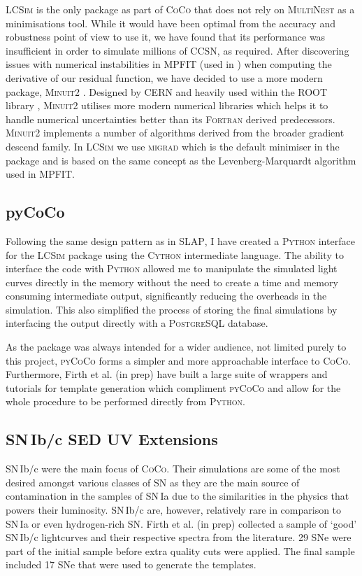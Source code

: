 \textsc{LCSim} is the only package as part of \textsc{CoCo} that does not rely on \textsc{MultiNest} as a minimisations tool. While it would have been optimal from the accuracy and robustness point of view to use it, we have found that its performance was insufficient in order to simulate millions of CCSN, as required. After discovering issues with numerical instabilities in \textsc{MPFIT} (used in ) when computing the derivative of our residual function, we have decided to use a more modern package, \textsc{Minuit2} \citep{James1975}. Designed by CERN and heavily used within the ROOT library \citep{Brun1997}, \textsc{Minuit2} utilises more modern numerical libraries which helps it to handle numerical uncertainties better than its \textsc{Fortran} derived predecessors. \textsc{Minuit2} implements a number of algorithms derived from the broader gradient descend family. In \textsc{LCSim} we use \textsc{migrad} which is the default minimiser in the package and is based on the same concept as the Levenberg-Marquardt algorithm used in \textsc{MPFIT}.

\subsection{pyCoCo}
Following the same design pattern as in \textsc{SLAP}, I have created a \textsc{Python} interface for the \textsc{LCSim} package using the \textsc{Cython} intermediate language. The ability to interface the code with \textsc{Python} allowed me to manipulate the simulated light curves directly in the memory without the need to create a time and memory consuming intermediate output, significantly reducing the overheads in the simulation. This also simplified the process of storing the final simulations by interfacing the output directly with a \textsc{PostgreSQL} database.

As the package was always intended for a wider audience, not limited purely to this project, \textsc{pyCoCo} forms a simpler and more approachable interface to \textsc{CoCo}. Furthermore, Firth et al. (in prep) have built a large suite of wrappers and tutorials for template generation which compliment \textsc{pyCoCo} and allow for the whole procedure to be performed directly from \textsc{Python}.

\subsection{SN\,Ib/c SED UV Extensions}
SN\,Ib/c were the main focus of \textsc{CoCo}. Their simulations are some of the most desired amongst various classes of SN as they are the main source of contamination in the samples of SN\,Ia due to the similarities in the physics that powers their luminosity. SN\,Ib/c are, however, relatively rare in comparison to SN\,Ia or even hydrogen-rich SN.   Firth et al. (in prep) collected a sample of `good' SN\,Ib/c lightcurves and their respective spectra from the literature. 29 SNe were part of the initial sample before extra quality cuts were applied. The final sample included 17 SNe that were used to generate the templates.


